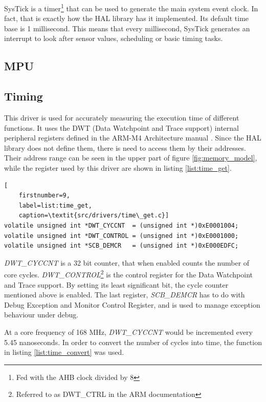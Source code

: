 SysTick is a timer\footnote{Fed with the AHB clock divided by 8} that can 
be used to generate the main system event clock.
In fact, that is exactly how the HAL library has it implemented. Its
default time base is 1 millisecond. This means that every millisecond,
SysTick generates an interrupt to look after sensor values, scheduling or
basic timing tasks.

\subsection{MPU}

\subsection{Timing}
This driver is used for accurately measuring the execution time of different
functions. It uses the DWT (Data Watchpoint  and Trace support)
internal peripheral registers defined in the ARM-M4 Architecture 
manual \cite{arm_architecture}.
Since the HAL library does not define them, there is need to access them
by their addresses. Their address range can be seen in the upper part of
figure \ref{fig:memory_model}, while the register used by this driver are 
shown in listing \ref{list:time_get}.

\begin{minipage}{\linewidth}
\begin{lstlisting}[
	firstnumber=9,
	label=list:time_get,
	caption=\textit{src/drivers/time\_get.c}]
volatile unsigned int *DWT_CYCCNT  = (unsigned int *)0xE0001004;
volatile unsigned int *DWT_CONTROL = (unsigned int *)0xE0001000;
volatile unsigned int *SCB_DEMCR   = (unsigned int *)0xE000EDFC;
\end{lstlisting}
\end{minipage}

\textit{DWT\_CYCCNT} is a 32 bit counter, that when enabled counts
the number of core cycles. \textit{DWT\_CONTROL}\footnote{Referred to
as DWT\_CTRL in the ARM documentation} is the control register for the
Data Watchpoint and Trace support. By setting its least significant bit,
the cycle counter mentioned above is enabled. The last register,
\textit{SCB\_DEMCR} has to do with Debug Exception and Monitor Control Register, and is used to manage exception behaviour under debug.

At a core frequency of 168 MHz, \textit{DWT\_CYCCNT} would be
incremented every 5.45 nanoseconds. In order to convert the number 
of cycles into time, the function in listing \ref{list:time_convert}
was used.

